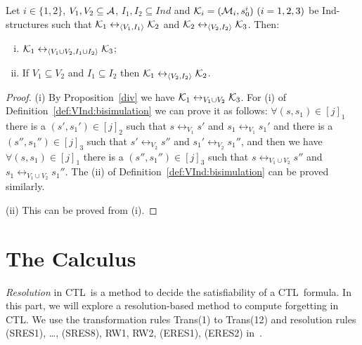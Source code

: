 \documentclass[runningheads]{llncs}
\newcommand{\tuple}[1]{{\langle{#1}\rangle}}
\newcommand{\lrto}{\leftrightarrow}
\newcommand{\Hm} {{\cal M}}
\newcommand{\CTL}{\textrm{CTL}}
\begin{document}
\begin{proposition}\label{pro:VI:div}
Let $i\in \{1,2\}$, $V_1,V_2\subseteq\cal A$, $I_1, I_2 \subseteq Ind$
and ${\cal K}_i=({\cal M}_i,s_0^i)~(i=1,2,3)$ be Ind-structures
 such that
${\cal K}_1\lrto_{\tuple{V_1, I_1}}{\cal K}_2$ and ${\cal K}_2\lrto_{\tuple{V_2,I_2}}{\cal K}_3$.
 Then:
 \begin{enumerate}[(i)]
   \item ${\cal K}_1\lrto_{\tuple{V_1\cup V_2, I_1 \cup I_2}}{\cal K}_3$;
   \item If $V_1 \subseteq V_2$ and $I_1 \subseteq I_2$ then ${\cal K}_1 \lrto_{\tuple{V_2, I_2}} {\cal K}_2$.
 \end{enumerate}
\end{proposition}
\begin{proof}
(i) By Proposition~\ref{div} we have ${\cal K}_1\lrto_{V_1\cup V_2}{\cal K}_3$. For (i) of Definition~\ref{def:VInd:bisimulation} we can prove it as follows:
$\forall (s,s_1) \in [j]_1$ there is a $(s', s_1') \in [j]_2$ such that $s\lrto_{V_1} s'$ and $s_1 \lrto_{V_1} s_1'$ and there is a $(s'', s_1'') \in [j]_3$ such that $s'\lrto_{V_2} s''$ and $s_1' \lrto_{V_2} s_1''$, and then we have $\forall (s,s_1) \in [j]_1$ there is a $(s'', s_1'') \in [j]_3$ such that $s  \lrto_{V_1\cup V_2} s''$ and $s_1 \lrto_{V_1\cup V_2} s_1''$. The (ii) of Definition~\ref{def:VInd:bisimulation} can be proved similarly.

(ii) This can be proved from (i).
\end{proof}



\section{The Calculus}
\emph{Resolution} in \CTL\ is a method to decide the satisfiability of a \CTL\ formula.
In this part, we will explore a resolution-based method to compute forgetting in \CTL.
We use the transformation rules Trans(1) to Trans(12) and resolution rules (SRES1), \dots, (SRES8), RW1, RW2, (ERES1), (ERES2) in~\cite{zhang2009refined}.
\end{document}
